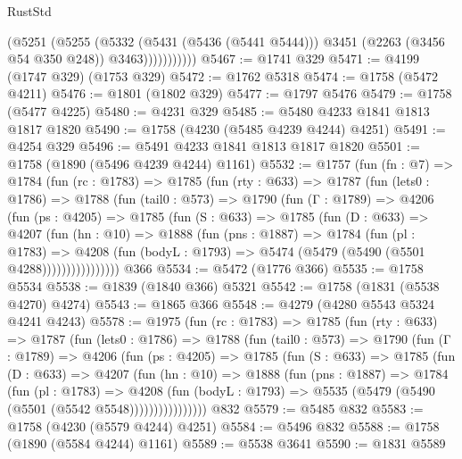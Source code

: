\begin{lexlean}{RustStd}
\begin{coremodule}
{\begin{coremodule}
{{{{{{{{{{{{{{{                    (@5251
                      (@5255
                        (@5332
                          (@5431 (@5436 (@5441 @5444)))
                          @3451
                          (@2263 (@3456 @54 @350 @248))
                          @3463)))))))))))
@5467 := @1741 @329
@5471 := @4199 (@1747 @329) (@1753 @329)
@5472 := @1762 @5318
@5474 := @1758 (@5472 @4211)
@5476 := @1801 (@1802 @329)
@5477 := @1797 @5476
@5479 := @1758 (@5477 @4225)
@5480 := @4231 @329
@5485 := @5480 @4233 @1841 @1813 @1817 @1820
@5490 := @1758 (@4230 (@5485 @4239 @4244) @4251)
@5491 := @4254 @329
@5496 := @5491 @4233 @1841 @1813 @1817 @1820
@5501 := @1758 (@1890 (@5496 @4239 @4244) @1161)
@5532 := @1757
    (fun (fn : @7) =>
    @1784
      (fun (rc : @1783) =>
      @1785
        (fun (rty : @633) =>
        @1787
          (fun (lets0 : @1786) =>
          @1788
            (fun (tail0 : @573) =>
            @1790
              (fun (Γ : @1789) =>
              @4206
                (fun (ps : @4205) =>
                @1785
                  (fun (S : @633) =>
                  @1785
                    (fun (D : @633) =>
                    @4207
                      (fun (hn : @10) =>
                      @1888
                        (fun (pns : @1887) =>
                        @1784
                          (fun (pl : @1783) =>
                          @4208
                            (fun (bodyL : @1793) => @5474 (@5479 (@5490 (@5501 @4288))))))))))))))))
    @366
@5534 := @5472 (@1776 @366)
@5535 := @1758 @5534
@5538 := @1839 (@1840 @366) @5321
@5542 := @1758 (@1831 (@5538 @4270) @4274)
@5543 := @1865 @366
@5548 := @4279 (@4280 @5543 @5324 @4241 @4243)
@5578 := @1975
    (fun (rc : @1783) =>
    @1785
      (fun (rty : @633) =>
      @1787
        (fun (lets0 : @1786) =>
        @1788
          (fun (tail0 : @573) =>
          @1790
            (fun (Γ : @1789) =>
            @4206
              (fun (ps : @4205) =>
              @1785
                (fun (S : @633) =>
                @1785
                  (fun (D : @633) =>
                  @4207
                    (fun (hn : @10) =>
                    @1888
                      (fun (pns : @1887) =>
                      @1784
                        (fun (pl : @1783) =>
                        @4208
                          (fun (bodyL : @1793) =>
                          @5535 (@5479 (@5490 (@5501 (@5542 @5548))))))))))))))))
    @832
@5579 := @5485 @832
@5583 := @1758 (@4230 (@5579 @4244) @4251)
@5584 := @5496 @832
@5588 := @1758 (@1890 (@5584 @4244) @1161)
@5589 := @5538 @3641
@5590 := @1831 @5589
}}}}}}}}}}}}}}}
\end{coremodule}}
\end{coremodule}
\end{lexlean}
